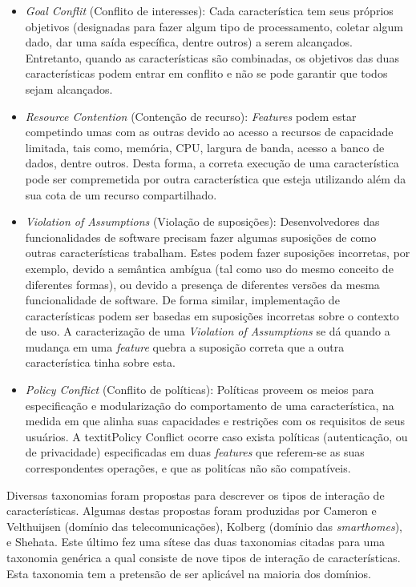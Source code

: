 \begin{itemize}
\item \textit{Goal Conflit} (Conflito de interesses): Cada característica tem seus próprios objetivos (designadas para fazer algum tipo de processamento, coletar algum dado, dar uma saída específica, dentre outros) a serem alcançados. Entretanto, quando as características são combinadas, os objetivos das duas características podem entrar em conflito e não se pode garantir que todos sejam alcançados. 
\item \textit{Resource Contention} (Contenção de recurso): \textit{Features} podem estar competindo umas com as outras devido ao acesso a recursos de capacidade limitada, tais como, memória, CPU, largura de banda, acesso a banco de dados, dentre outros. Desta forma, a correta execução de uma característica pode ser compremetida por outra característica que esteja utilizando além da sua cota de um recurso compartilhado.
\item \textit{Violation of Assumptions} (Violação de suposições): Desenvolvedores das funcionalidades de software precisam fazer algumas suposições de como outras características trabalham. Estes podem fazer suposições incorretas, por exemplo, devido a semântica ambígua (tal como uso do mesmo conceito de diferentes formas), ou devido a presença de diferentes versões da mesma funcionalidade de software. De forma similar, implementação de características podem ser basedas em suposições incorretas sobre o contexto de uso. A caracterização de uma  \textit{Violation of Assumptions} se dá quando a mudança em uma \textit{feature} quebra a suposição correta que a outra característica tinha sobre esta.
\item \textit{Policy Conflict} (Conflito de políticas): Políticas proveem os meios para especificação e modularização do comportamento de uma característica, na medida em que alinha suas capacidades e restrições com os requisitos de seus usuários. A textit{Policy Conflict} ocorre caso exista políticas (autenticação, ou de privacidade) especificadas em duas \textit{features} que referem-se as suas correspondentes operações, e que as politícas não são compatíveis.
\end{itemize}

Diversas taxonomias foram propostas para descrever os tipos de interação de características. Algumas destas propostas foram produzidas por Cameron e Velthuijsen (domínio das telecomunicações), Kolberg (domínio das \textit{smarthomes}), e Shehata. Este último fez uma sítese das duas taxonomias citadas para uma taxonomia genérica a qual consiste de nove tipos de interação de características. Esta taxonomia tem a pretensão de ser aplicável na maioria dos domínios.\cite{NHLABATSI:2008}

